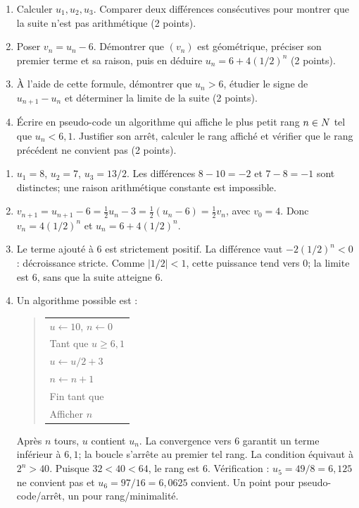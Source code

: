 \begin{enumerate}
\item Calculer $u_1,u_2,u_3$. Comparer deux différences consécutives pour montrer que la suite n’est pas arithmétique (2 points).
\item Poser $v_n=u_n-6$. Démontrer que $(v_n)$ est géométrique, préciser son premier terme et sa raison, puis en déduire $u_n=6+4(1/2)^n$ (2 points).
\item À l’aide de cette formule, démontrer que $u_n>6$, étudier le signe de $u_{n+1}-u_n$ et déterminer la limite de la suite (2 points).
\item Écrire en pseudo-code un algorithme qui affiche le plus petit rang $n\in N$ tel que $u_n<6{,}1$. Justifier son arrêt, calculer le rang affiché et vérifier que le rang précédent ne convient pas (2 points).
\end{enumerate}
\begin{corrige}\label{sol-t11s-ds2-e03}
\begin{enumerate}
\item $u_1=8$, $u_2=7$, $u_3=13/2$. Les différences $8-10=-2$ et $7-8=-1$ sont distinctes; une raison arithmétique constante est impossible.
\item $v_{n+1}=u_{n+1}-6=\frac12u_n-3=\frac12(u_n-6)=\frac12v_n$, avec $v_0=4$. Donc $v_n=4(1/2)^n$ et $u_n=6+4(1/2)^n$.
\item Le terme ajouté à $6$ est strictement positif. La différence vaut $-2(1/2)^n<0$ : décroissance stricte. Comme $|1/2|<1$, cette puissance tend vers $0$; la limite est $6$, sans que la suite atteigne $6$.
\item Un algorithme possible est :
\begin{quote}\begin{tabular}{l}
$u\leftarrow10$, $n\leftarrow0$\\
Tant que $u\ge6{,}1$\\
\quad $u\leftarrow u/2+3$\\
\quad $n\leftarrow n+1$\\
Fin tant que\\Afficher $n$
\end{tabular}\end{quote}
Après $n$ tours, $u$ contient $u_n$. La convergence vers $6$ garantit un terme inférieur à $6{,}1$; la boucle s’arrête au premier tel rang. La condition équivaut à $2^n>40$. Puisque $32<40<64$, le rang est $6$. Vérification : $u_5=49/8=6{,}125$ ne convient pas et $u_6=97/16=6{,}0625$ convient. Un point pour pseudo-code/arrêt, un pour rang/minimalité.
\end{enumerate}
\end{corrige}
\endgroup
